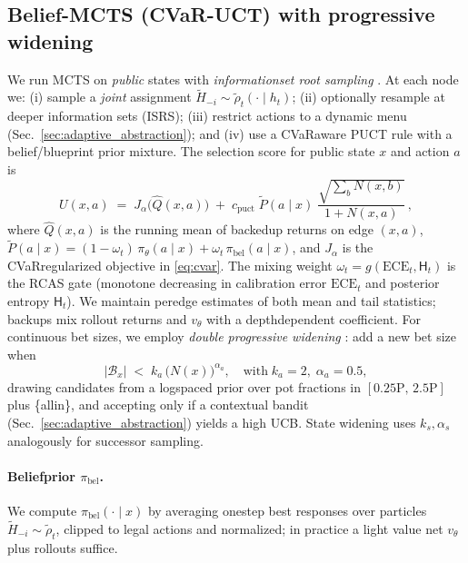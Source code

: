 \documentclass[10pt]{article}
\newcommand{\1}{\mathbf{1}}
\theoremstyle{plain}
\begin{document}
\subsection{Belief-MCTS (CVaR-UCT) with progressive widening}
We run MCTS on \emph{public} states with \emph{information\textendash set root sampling} \citep{silver2010pomcp,cowling2012ismcts}. At each node we: (i) sample a \emph{joint} assignment $\tilde H_{-i}\sim \tilde{\rho}_t(\cdot\mid h_t)$; (ii) optionally re\textendash sample at deeper information sets (IS\textendash RS); (iii) restrict actions to a dynamic menu (Sec.~\ref{sec:adaptive_abstraction}); and (iv) use a CVaR\textendash aware PUCT rule with a belief/blueprint prior mixture.
The selection score for public state $x$ and action $a$ is
\begin{equation}
\label{eq:puct}
U(x,a)\;=\;J_\alpha\!\big(\widehat{Q}(x,a)\big)\;+\;c_{\text{puct}}\;\tilde P(a\mid x)\;\frac{\sqrt{\sum_b N(x,b)}}{1+N(x,a)}\,,
\end{equation}
where $\widehat{Q}(x,a)$ is the running mean of backed\textendash up returns on edge $(x,a)$, $\tilde P(a\mid x)=(1-\omega_t)\,\pi_\theta(a\mid x)+\omega_t\,\pi_{\text{bel}}(a\mid x)$, and $J_\alpha$ is the CVaR\textendash regularized objective in \cref{eq:cvar}. The mixing weight $\omega_t=g(\mathrm{ECE}_t,\mathsf{H}_t)$ is the RCAS gate (monotone decreasing in calibration error $\mathrm{ECE}_t$ and posterior entropy $\mathsf{H}_t$). We maintain per\textendash edge estimates of both mean and tail statistics; backups mix rollout returns and $v_\theta$ with a depth\textendash dependent coefficient.
For continuous bet sizes, we employ \emph{double progressive widening} \citep{couetoux2011dpw}: add a new bet size when
\begin{equation}
\label{eq:widen}
|\mathcal{B}_x| \;<\; k_a\,\big(N(x)\big)^{\alpha_a},\quad \text{with}\; k_a{=}2,\; \alpha_a{=}0.5,
\end{equation}
drawing candidates from a log\textendash spaced prior over pot fractions in $[0.25\mathrm{P},\,2.5\mathrm{P}]$ plus \{all\textendash in\}, and accepting only if a contextual bandit (Sec.~\ref{sec:adaptive_abstraction}) yields a high UCB. State widening uses $k_s,\alpha_s$ analogously for successor sampling.
\paragraph{Belief\textendash prior $\pi_{\text{bel}}$.}
We compute $\pi_{\text{bel}}(\cdot\mid x)$ by averaging one\textendash step best responses over particles $\tilde H_{-i}\sim \tilde{\rho}_t$, clipped to legal actions and normalized; in practice a light value net $v_\theta$ plus rollouts suffice.
\end{document}
